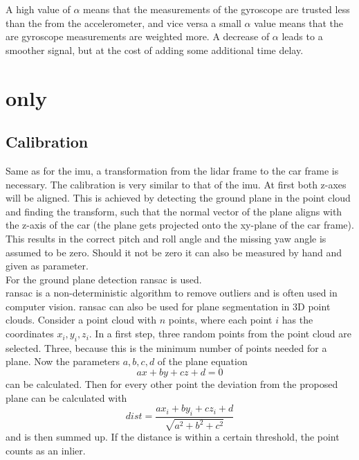 A high value of $\alpha$ means that the measurements of the gyroscope are trusted less than the from the accelerometer, and vice versa a small $\alpha$ value means that the are gyroscope measurements are weighted more.
A decrease of $\alpha$ leads to a smoother signal, but at the cost of adding some additional time delay.


\section{ only}
\subsection{Calibration}
Same as for the \gls{imu}, a transformation from the \gls{lidar} frame to the car frame is necessary.
The calibration is very similar to that of the \gls{imu}.
At first both z-axes will be aligned.
This is achieved by detecting the ground plane in the point cloud and finding the transform, such that the normal vector of the plane aligns with the z-axis of the car (the plane gets projected onto the xy-plane of the car frame).
This results in the correct pitch and roll angle and the missing yaw angle is assumed to be zero.
Should it not be zero it can also be measured by hand and given as parameter.\\
For the ground plane detection \gls{ransac} \cite{Fischler1981} is used.\\
\gls{ransac} is a non-deterministic algorithm to remove outliers and is often used in computer vision.
\gls{ransac} can also be used for plane segmentation in 3D point clouds.
Consider a point cloud with $n$ points, where each point $i$ has the coordinates $x_i, y_i, z_i$.
In a first step, three random points from the point cloud are selected.
Three, because this is the minimum number of points needed for a plane.
Now the parameters $a, b, c, d$ of the plane equation
\begin{equation}
    ax + by + cz + d = 0
\end{equation}
can be calculated.
Then for every other point the deviation from the proposed plane can be calculated with
\begin{equation}
    dist = \frac{ax_i + by_i + cz_i + d}{\sqrt{a^2 + b^2 + c^2}}
\end{equation}
and is then summed up.
If the distance is within a certain threshold, the point counts as an inlier.
